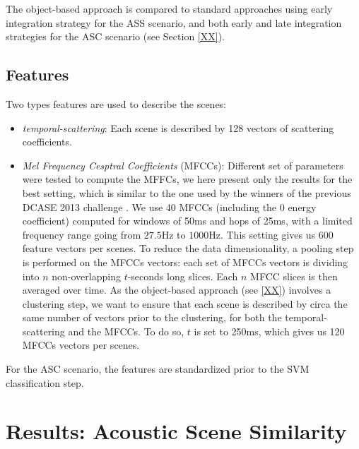 \documentclass[journal]{IEEEtran}
\begin{document}
The object-based approach is compared to standard approaches using early integration strategy for the ASS scenario, and both early and late integration strategies for the ASC scenario (see Section \ref{XX}). 

\subsection{Features}

Two types features are used to describe the scenes: 

\begin{itemize}
\item \emph{temporal-scattering}: Each scene is described by 128 vectors of scattering coefficients. 
\item \emph{Mel Frequency Cesptral Coefficients} (MFCCs): Different set of parameters were tested to compute the MFFCs, we here present only the results for the best setting, which is similar to the one used by the winners of the previous DCASE 2013 challenge \cite{roma2013}. We use 40 MFCCs (including the 0 energy coefficient) computed for windows of 50ms and hops of 25ms, with a limited frequency range going from $27.5$Hz to $1000$Hz. This setting gives us 600 feature vectors per scenes. To reduce the data dimensionality, a pooling step is performed on the MFCCs vectors: each set of MFCCs vectors is dividing into $n$ non-overlapping $t$-seconds long slices. Each $n$ MFCC slices is then averaged over time. As the object-based approach (see \ref{XX}) involves a clustering step, we want to ensure that each scene is described by circa the same number of vectors prior to the clustering, for both the temporal-scattering and the MFCCs. To do so, $t$ is set to 250ms, which gives us 120 MFCCs vectors per scenes. 
\end{itemize}

For the ASC scenario, the features are standardized prior to the SVM classification step.

\section{Results: Acoustic Scene Similarity}
\end{document}
